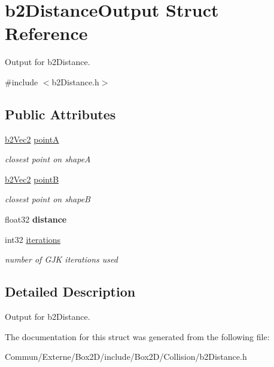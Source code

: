 \hypertarget{structb2_distance_output}{}\section{b2\+Distance\+Output Struct Reference}
\label{structb2_distance_output}


Output for b2\+Distance.  




{\ttfamily \#include $<$b2\+Distance.\+h$>$}

\subsection*{Public Attributes}
\begin{DoxyCompactItemize}
\item 
\hyperlink{structb2_vec2}{b2\+Vec2} \hyperlink{structb2_distance_output_a7e0f1f44a64e596dc7d37570c69eefce}{pointA}\hypertarget{structb2_distance_output_a7e0f1f44a64e596dc7d37570c69eefce}{}\label{structb2_distance_output_a7e0f1f44a64e596dc7d37570c69eefce}

\begin{DoxyCompactList}\small\item\em closest point on shapeA \end{DoxyCompactList}\item 
\hyperlink{structb2_vec2}{b2\+Vec2} \hyperlink{structb2_distance_output_aa85beca17337a506cd4a924d0c6f92cc}{pointB}\hypertarget{structb2_distance_output_aa85beca17337a506cd4a924d0c6f92cc}{}\label{structb2_distance_output_aa85beca17337a506cd4a924d0c6f92cc}

\begin{DoxyCompactList}\small\item\em closest point on shapeB \end{DoxyCompactList}\item 
float32 {\bfseries distance}\hypertarget{structb2_distance_output_ae67f480ff37d4ab732e6366f485c7f55}{}\label{structb2_distance_output_ae67f480ff37d4ab732e6366f485c7f55}

\item 
int32 \hyperlink{structb2_distance_output_ae2d4c84dd3d05ea4f4d20c91099ec8d5}{iterations}\hypertarget{structb2_distance_output_ae2d4c84dd3d05ea4f4d20c91099ec8d5}{}\label{structb2_distance_output_ae2d4c84dd3d05ea4f4d20c91099ec8d5}

\begin{DoxyCompactList}\small\item\em number of G\+JK iterations used \end{DoxyCompactList}\end{DoxyCompactItemize}


\subsection{Detailed Description}
Output for b2\+Distance. 

The documentation for this struct was generated from the following file\+:\begin{DoxyCompactItemize}
\item 
Commun/\+Externe/\+Box2\+D/include/\+Box2\+D/\+Collision/b2\+Distance.\+h\end{DoxyCompactItemize}
